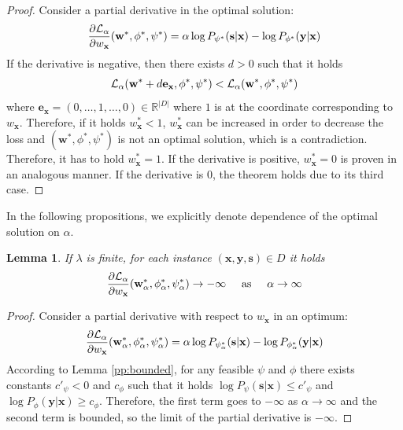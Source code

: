\documentclass[preprint,12pt]{elsarticle}
\newtheorem{lemma}{Lemma}
\begin{document}
\begin{proof}
	Consider a partial derivative in the optimal solution:
	$$\frac{\partial{\cal L}_\alpha}{\partial w_\mathbf{x}}(\mathbf{w}^*,\phi^*,\psi^*)=\alpha\log P_{\psi^*}(\mathbf{s}|\mathbf{x})-\log P_{\phi^*}(\mathbf{y}|\mathbf{x})$$
	If the derivative is negative, then there exists $d>0$ such that it holds
	$${\cal L}_\alpha(\mathbf{w}^*+d\mathbf{e}_{\mathbf{x}},\phi^*,\psi^*) < {\cal L}_\alpha(\mathbf{w}^*,\phi^*,\psi^*)$$
	where $\mathbf{e}_\mathbf{x}=(0,\ldots,1,\ldots,0)\in\mathbb{R}^{|D|}$ where $1$ is at the coordinate corresponding to $w_\mathbf{x}$.
	Therefore, if it holds $w_\mathbf{x}^*< 1$, $w_\mathbf{x}^*$ can be increased in order to decrease the loss and $(\mathbf{w}^*,\phi^*,\psi^*)$ is not an optimal solution, which is a contradiction. Therefore, it has to hold $w_\mathbf{x}^*=1$.
	If the derivative is positive, $w_\mathbf{x}^*=0$ is proven in an analogous manner.
	If the derivative is $0$, the theorem holds due to its third case.
\end{proof}


In the following propositions, we explicitly denote dependence of the optimal solution on $\alpha$.

\begin{lemma}
	If $\lambda$ is finite, for each instance $(\mathbf{x},\mathbf{y},\mathbf{s})\in D$ it holds
	$$\frac{\partial{\cal L}_\alpha}{\partial w_\mathbf{x}}(\mathbf{w}^*_\alpha,\phi^*_\alpha,\psi^*_\alpha)\rightarrow -\infty\hspace{5mm}\text{as}\hspace{5mm}\alpha\rightarrow\infty$$
	\label{pp:regularization}
\end{lemma}
\begin{proof}
	Consider a partial derivative with respect to $w_\mathbf{x}$ in an optimum:
	$$\frac{\partial{\cal L}_\alpha}{\partial w_\mathbf{x}}(\mathbf{w}^*_\alpha,\phi^*_\alpha,\psi^*_\alpha)=\alpha\log P_{\psi^*_\alpha}(\mathbf{s}|\mathbf{x})-\log P_{\phi^*_\alpha}(\mathbf{y}|\mathbf{x})$$
	According to Lemma \ref{pp:bounded}, for any feasible $\psi$ and $\phi$ there exists constants $c'_\psi<0$ and $c_\phi$ such that it holds $\log P_{\psi}(\mathbf{s}|\mathbf{x})\leq c'_\psi$ and $\log P_{\phi}(\mathbf{y}|\mathbf{x})\geq c_\phi$. Therefore, the first term goes to $-\infty$ as $\alpha\rightarrow\infty$ and the second term is bounded, so the limit of the partial derivative is $-\infty$.
\end{proof}
\end{document}
